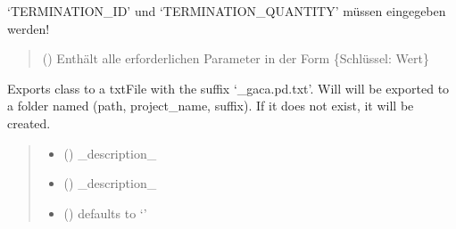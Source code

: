 \documentclass[letterpaper,10pt,english]{sphinxmanual}
\begin{document}
\begin{fulllineitems}
\begin{fulllineitems}
\begin{itemize}
\end{itemize}

\sphinxAtStartPar
‘TERMINATION\_ID’ und ‘TERMINATION\_QUANTITY’ müssen eingegeben werden!
\begin{quote}\begin{description}
\sphinxAtStartPar
{} () \textendash{} Enthält alle erforderlichen Parameter in der Form \{Schlüssel: Wert\}

\end{description}\end{quote}

\end{fulllineitems}


\begin{fulllineitems}
\label{\detokenize{tscw_module:tscw_module.tscw_DataClassesInput.GacaProcessData.export_processData}}
\pysigstartsignatures
{}
\pysigstopsignatures
\sphinxAtStartPar
Exports class to a txt\sphinxhyphen{}File with the suffix ‘\_gaca.pd.txt’.
Will will be exported to a folder named (path, project\_name, suffix). If it does not exist, it will be created.
\begin{quote}\begin{description}
\begin{itemize}
\item {} 
\sphinxAtStartPar
{} () \textendash{} \_description\_

\item {} 
\sphinxAtStartPar
{} () \textendash{} \_description\_

\item {} 
\sphinxAtStartPar
{} (\sphinxstyleliteralemphasis{\sphinxupquote{, }}) \textendash{} defaults to ‘’

\end{itemize}

\end{description}\end{quote}

\end{fulllineitems}


\end{fulllineitems}
\end{document}
